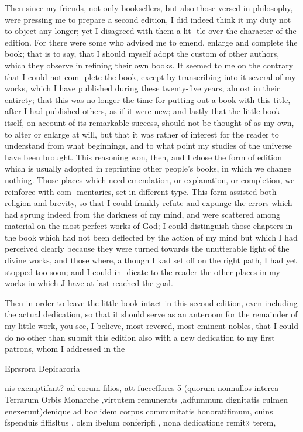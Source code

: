 \documentclass{article}
\begin{document}
{Then since my friends, not only booksellers, but also those versed in
philosophy, were pressing me to prepare a second edition, I did indeed
think it my duty not to object any longer; yet I disagreed with them a lit-
tle over the character of the edition. For there were some who advised me
to emend, enlarge and complete the book; that is to say, that I should
myself adopt the custom of other authors, which they observe in refining
their own books. It seemed to me on the contrary that I could not com-
plete the book, except by transcribing into it several of my works, which
I have published during these twenty-five years, almost in their entirety;
that this was no longer the time for putting out a book with this title,
after I had published others, as if it were new; and lastly that the little
book itself, on account of its remarkable success, should not be thought
of as my own, to alter or enlarge at will, but that it was rather of interest
for the reader to understand from what beginnings, and to what point
my studies of the universe have been brought. This reasoning won, then,
and I chose the form of edition which is usually adopted in reprinting
other people’s books, in which we change nothing. Those places which
need emendation, or explanation, or completion, we reinforce with com-
mentaries, set in different type. This form assisted both religion and
brevity, so that I could frankly refute and expunge the errors which had
sprung indeed from the darkness of my mind, and were scattered among
material on the most perfect works of God; I could distinguish those
chapters in the book which had not been deflected by the action of my
mind but which I had perceived clearly because they were turned towards
the unutterable light of the divine works, and those where, although I
kad set off on the right path, I had yet stopped too soon; and I could in-
dicate to the reader the other places in my works in which J have at last
reached the goal.

Then in order to leave the little book intact in this second edition, even
including the actual dedication, so that it should serve as an anteroom
for the remainder of my little work, you see, I believe, most revered,
most eminent nobles, that I could do no other than submit this edition
also with a new dedication to my first patrons, whom I addressed in the

Eprsrora Depicaroria

nis exemptifant? ad eorum filios, att fucceffores 5 (quorum nonnullos interea
Terrarum Orbis Monarche ,virtutem remunerats ,adfummum dignitatis
culmen enexerunt)denique ad hoc idem corpus communitatis honoratifimum,
cuins fspenduis fiffisltus , olsm ibelum conferipfi , nona dedicatione remit»
terem,

}
\end{document}
